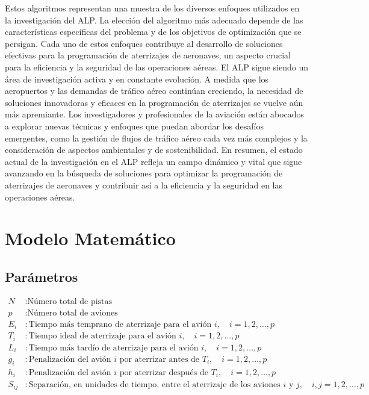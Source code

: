 \documentclass[letter, 10pt]{article}
\begin{document}
Estos algoritmos representan una muestra de los diversos enfoques utilizados en la investigaci\'on del ALP. La elecci\'on del algoritmo m\'as adecuado depende de las caracter\'isticas espec\'ificas del problema y de los objetivos de optimizaci\'on que se persigan. Cada uno de estos enfoques contribuye al desarrollo de soluciones efectivas para la programaci\'on de aterrizajes de aeronaves, un aspecto crucial para la eficiencia y la seguridad de las operaciones a\'ereas. El ALP sigue siendo un \'area de investigaci\'on activa y en constante evoluci\'on. A medida que los aeropuertos y las demandas de tr\'afico a\'ereo contin\'uan creciendo, la necesidad de soluciones innovadoras y eficaces en la programaci\'on de aterrizajes se vuelve a\'un m\'as apremiante. Los investigadores y profesionales de la aviaci\'on est\'an abocados a explorar nuevas t\'ecnicas y enfoques que puedan abordar los desaf\'ios emergentes, como la gesti\'on de flujos de tr\'afico a\'ereo cada vez m\'as complejos y la consideraci\'on de aspectos ambientales y de sostenibilidad. En resumen, el estado actual de la investigaci\'on en el ALP refleja un campo din\'amico y vital que sigue avanzando en la b\'usqueda de soluciones para optimizar la programaci\'on de aterrizajes de aeronaves y contribuir as\'i a la eficiencia y la seguridad en las operaciones a\'ereas.

\section{Modelo Matem\'atico}
\subsection{Par\'ametros}
\begin{align*}
N & : \text{N\'umero total de pistas} \\
p & : \text{N\'umero total de aviones} \\
E_i & : \text{Tiempo m\'as temprano de aterrizaje para el avi\'on } i, \quad i = 1,2,\ldots,p \\
T_i & : \text{Tiempo ideal de aterrizaje para el avi\'on } i, \quad i = 1,2,\ldots,p \\
L_i & : \text{Tiempo m\'as tard\'io de aterrizaje para el avi\'on } i, \quad i = 1,2,\ldots,p \\
g_i & : \text{Penalizaci\'on del avi\'on } i \text{ por aterrizar antes de } T_i, \quad i = 1,2,\ldots,p \\
h_i & : \text{Penalizaci\'on del avi\'on } i \text{ por aterrizar despu\'es de } T_i, \quad i = 1,2,\ldots,p \\
S_{ij} & : \text{Separaci\'on, en unidades de tiempo, entre el aterrizaje de los aviones } i \text{ y } j, \quad i, j = 1,2,\ldots,p \\
\end{align*}
\end{document}
